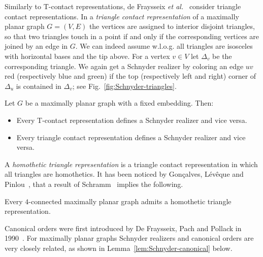 \documentclass{llncs}
\begin{document}
Similarly to T-contact representations, de Fraysseix \textit{et al.}~\cite{FraysseixTContact} consider triangle contact representations. In a \emph{triangle contact representation} of a maximally planar graph $G = (V,E)$ the vertices are assigned to interior disjoint triangles, so that two triangles touch in a point if and only if the corresponding vertices are joined by an edge in $G$. We can indeed assume w.l.o.g. all triangles are isosceles with horizontal bases and the tip above. For a vertex $v \in V$ let $\Delta_v$ be the corresponding triangle. We again get a Schnyder realizer by coloring an edge $uv$ red (respectively blue and green) if the top (respectively left and right) corner of $\Delta_u$ is contained in $\Delta_v$; see Fig.~\ref{fig:Schnyder-triangles}.

\begin{theorem}
 Let $G$ be a maximally planar graph with a fixed embedding. Then:
 \begin{itemize}
  \item Every T-contact representation defines a Schnyder realizer and vice versa.
  \item Every triangle contact representation defines a Schnyder realizer and vice versa.
 \end{itemize} 
\end{theorem}

A \emph{homothetic triangle representation} is a triangle contact representation in which all triangles are homothetics. It has been noticed by Gon{\c{c}}alves, L{\'e}v{\^e}que and Pinlou~\cite{gonccalves2012triangle}, that a result of Schramm~\cite{schramm2007combinatorically} implies the following.

\begin{theorem}\label{thm:homothetic-triangles}
 Every $4$-connected maximally planar graph admits a homothetic triangle representation.
\end{theorem}

Canonical orders were first introduced by De Fraysseix, Pach and Pollack in 1990~\cite{fpp-hdpgg-90}. For maximally planar graphs Schnyder realizers and canonical orders are very closely related, as shown in Lemma~\ref{lem:Schnyder-canonical} below.
\end{document}
